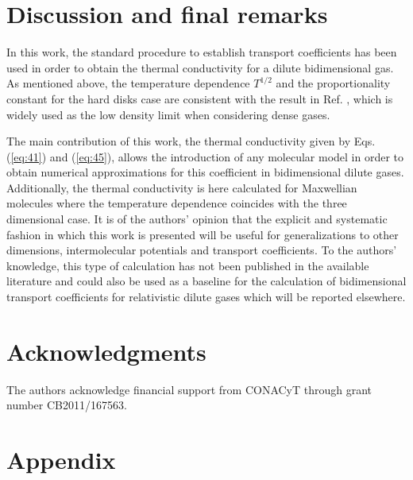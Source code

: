 \documentclass[11pt]{article} %
\begin{document}
\section{Discussion and final remarks}

In this work, the standard procedure to establish transport coefficients
has been used in order to obtain the thermal conductivity for a dilute
bidimensional gas. As mentioned above, the temperature dependence
$T^{1/2}$ and the proportionality constant for the hard disks case
are consistent with the result in Ref. \cite{Sengers}, which is widely
used as the low density limit when considering dense gases. 

The main contribution of this work, the thermal conductivity given
by Eqs. (\ref{eq:41}) and (\ref{eq:45}), allows the introduction
of any molecular model in order to obtain numerical approximations
for this coefficient in bidimensional dilute gases. Additionally,
the thermal conductivity is here calculated for Maxwellian molecules
where the temperature dependence coincides with the three dimensional
case. It is of the authors' opinion that the explicit and systematic
fashion in which this work is presented will be useful for generalizations
to other dimensions, intermolecular potentials and transport coefficients. To the
authors' knowledge, this type of calculation has not been published
in the available literature and could also be used as a baseline for
the calculation of bidimensional transport coefficients for relativistic
dilute gases which will be reported elsewhere.

\section*{Acknowledgments} The authors acknowledge financial support from CONACyT through grant
number CB2011/167563. 

\appendix
\section*{Appendix} \label{Appendix} 
\end{document}
